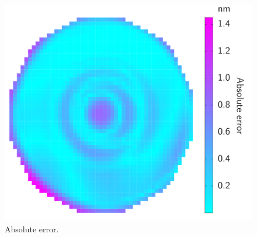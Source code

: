 \begin{figure}
  \centering
  \includegraphics[width=0.7\linewidth]{include/assets/wafer-qoi-error.pdf}
  \caption{Absolute error.}
  \vspace{-1.5em}
\end{figure}
